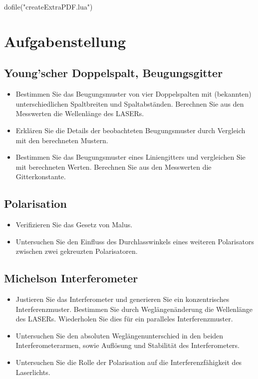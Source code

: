 \documentclass[12pt,english,ngerman]{scrartcl}
\begin{document}
\begin{luacode*}
dofile("createExtraPDF.lua")
\end{luacode*}

%
\tableofcontents

\newpage

\section{Aufgabenstellung}\label{Auf}

\subsection{Young'scher Doppelspalt, Beugungsgitter}

\begin{itemize}
	\item Bestimmen Sie das Beugungsmuster von vier Doppelspalten mit (bekannten)
	      unterschiedlichen Spaltbreiten und Spaltabständen. Berechnen Sie aus den
	      Messwerten die Wellenlänge des LASERs.
	\item Erklären Sie die Details der beobachteten Beugungsmuster durch Vergleich mit
	      den berechneten Mustern.
	\item Bestimmen Sie das Beugungsmuster eines Liniengitters und vergleichen Sie mit
	      berechneten Werten. Berechnen Sie aus den Messwerten die Gitterkonstante.
\end{itemize}

\subsection{Polarisation}

\begin{itemize}
	\item Verifizieren Sie das Gesetz von Malus.
	\item Untersuchen Sie den Einfluss des Durchlasswinkels eines weiteren Polarisators
	      zwischen zwei gekreuzten Polarisatoren.
\end{itemize}

\subsection{Michelson Interferometer}

\begin{itemize}
	\item Justieren Sie das Interferometer und generieren Sie ein konzentrisches
	      Interferenzmuster. Bestimmen Sie durch Weglängenänderung die Wellenlänge des
	      LASERs. Wiederholen Sie dies für ein paralleles Interferenzmuster.
	\item Untersuchen Sie den absoluten Weglängenunterschied in den beiden
	      Interferometerarmen, sowie Auflösung und Stabilität des Interferometers.
	\item Untersuchen Sie die Rolle der Polarisation auf die Interferenzfähigkeit des
	      Laserlichts.
\end{itemize}
\end{document}

